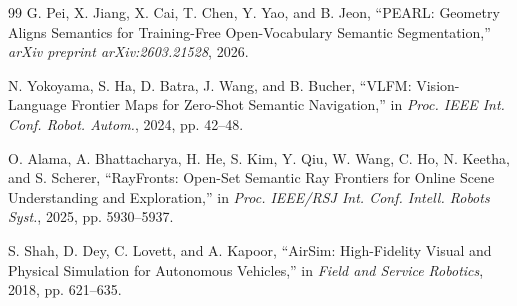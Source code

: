 \documentclass[letterpaper,10pt,conference]{ieeeconf}
\begin{document}
{\begin{thebibliography}{99}
G. Pei, X. Jiang, X. Cai, T. Chen, Y. Yao, and B. Jeon,
``PEARL: Geometry Aligns Semantics for Training-Free Open-Vocabulary Semantic Segmentation,''
\emph{arXiv preprint arXiv:2603.21528}, 2026.

N. Yokoyama, S. Ha, D. Batra, J. Wang, and B. Bucher,
``VLFM: Vision-Language Frontier Maps for Zero-Shot Semantic Navigation,''
in \emph{Proc. IEEE Int. Conf. Robot. Autom.}, 2024, pp. 42--48.

O. Alama, A. Bhattacharya, H. He, S. Kim, Y. Qiu, W. Wang, C. Ho, N. Keetha, and S. Scherer,
``RayFronts: Open-Set Semantic Ray Frontiers for Online Scene Understanding and Exploration,''
in \emph{Proc. IEEE/RSJ Int. Conf. Intell. Robots Syst.}, 2025, pp. 5930--5937.

S. Shah, D. Dey, C. Lovett, and A. Kapoor,
``AirSim: High-Fidelity Visual and Physical Simulation for Autonomous Vehicles,''
in \emph{Field and Service Robotics}, 2018, pp. 621--635.
\end{thebibliography}
}
\end{document}
